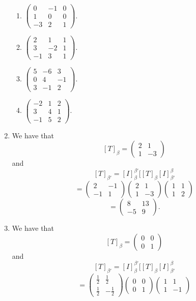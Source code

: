 \begin{enumerate}
\begin{enumerate}
\item $\left(\begin{array}{ccc}0&-1&0\\1&0&0\\-3&2&1\end{array}\right).$
\item $\left(\begin{array}{ccc}2&1&1\\3&-2&1\\-1&3&1\end{array}\right).$
\item $\left(\begin{array}{ccc}5&-6&3\\0&4&-1\\3&-1&2\end{array}\right).$
\item $\left(\begin{array}{ccc}-2&1&2\\3&4&1\\-1&5&2\end{array}\right).$
\end{enumerate}
\item We have that 
\[[T]_{\beta}=\left(\begin{array}{cc}2&1\\1&-3\end{array}\right)\]
and
\[[T]_{\beta'}=[I]_{\beta}^{\beta'}[[T]_{\beta}[I]_{\beta'}^{\beta}\]
\[=\left(\begin{array}{cc}2&-1\\-1&1\end{array}\right)\left(\begin{array}{cc}2&1\\1&-3\end{array}\right)\left(\begin{array}{cc}1&1\\1&2\end{array}\right)\]
\[=\left(\begin{array}{cc}8&13\\-5&9\end{array}\right).\]
\item We have that 
\[[T]_{\beta}=\left(\begin{array}{cc}0&0\\0&1\end{array}\right)\]
and
\[[T]_{\beta'}=[I]_{\beta}^{\beta'}[[T]_{\beta}[I]_{\beta'}^{\beta}\]
\[=\left(\begin{array}{cc}\frac{1}{2}&\frac{1}{2}\\\frac{1}{2}&-\frac{1}{2}\end{array}\right)\left(\begin{array}{cc}0&0\\0&1\end{array}\right)\left(\begin{array}{cc}1&1\\1&-1\end{array}\right)\]

\end{enumerate}
